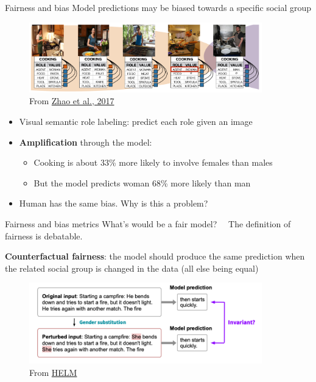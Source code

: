 \documentclass[usenames,dvipsnames,notes,11pt,aspectratio=169,hyperref={colorlinks=true, linkcolor=blue}]{beamer}
\begin{document}
\begin{frame}
    {Fairness and bias}
    Model predictions may be biased towards a specific social group
    \begin{figure}
        \includegraphics[width=0.9\textwidth]{figures/visual-gender}
        \caption{From \href{https://arxiv.org/pdf/1707.09457.pdf}{Zhao et al., 2017}}
    \end{figure}
    \vspace{-2em}
    \begin{itemize}
        \item Visual semantic role labeling: predict each role given an image
        \item \textbf{Amplification} through the model:
            \begin{itemize}
                \item Cooking is about 33\% more likely to involve females than males
                \item But the model predicts woman 68\% more likely than man
            \end{itemize}
        \pause
        \item Human has the same bias. Why is this a problem?
    \end{itemize}
\end{frame}

\begin{frame}
    {Fairness and bias metrics}
    What's would be a fair model?\pause $\quad$ The definition of fairness is debatable.

    \pause
    \textbf{Counterfactual fairness}: the model should produce the same prediction when the related social group is changed in the data (all else being equal)\\
    \begin{figure}
        \includegraphics[width=0.9\textwidth]{figures/counterfactual-fairness}
        \caption{From \href{https://arxiv.org/pdf/2211.09110.pdf}{HELM}}
    \end{figure}
\end{frame}
\end{document}
